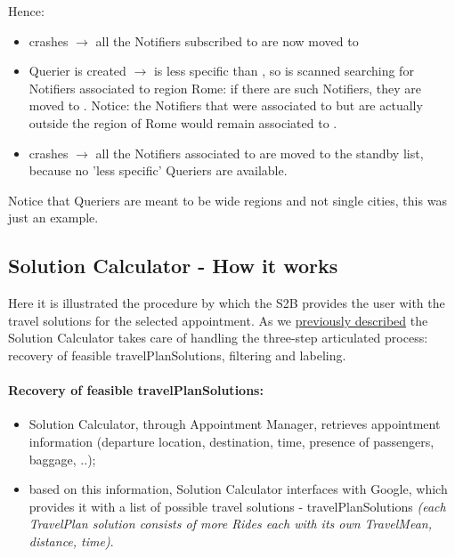 	Hence:
	\begin{itemize}[label=--]
		\item {} crashes $\rightarrow$ all the Notifiers subscribed to  are now moved to 
		\item {} Querier is created $\rightarrow$  is less specific than , so  is scanned searching for Notifiers associated to region Rome: if there are such Notifiers, they are moved to . Notice: the Notifiers that were associated to  but are actually outside the region of Rome would remain associated to .
		\item {} crashes $\rightarrow$ all the Notifiers associated to  are moved to the standby list, because no 'less specific' Queriers are available.
	\end{itemize}
	\smallskip
	Notice that Queriers are meant to be wide regions and not single cities, this was just an example.

\subsection{Solution Calculator - How it works}
		Here it is illustrated the procedure by which the S2B provides the user with the travel solutions for the selected appointment.
		As we \hyperref[sect:Select TravelPlan Solution]{previously described} the Solution Calculator takes care of handling the three-step  articulated process: recovery of feasible travelPlanSolutions, filtering and labeling.
	
	\paragraph{Recovery of feasible travelPlanSolutions:}
	\begin{itemize}
		\item  Solution Calculator, through Appointment Manager, retrieves appointment information (departure location, destination, time, presence of passengers, baggage, ..); 
		\item based on this information, Solution Calculator interfaces with Google, which provides it with a list of possible travel solutions - travelPlanSolutions  \textit{(each TravelPlan solution consists of more Rides each with its own TravelMean, distance, time)}.
	\end{itemize}


